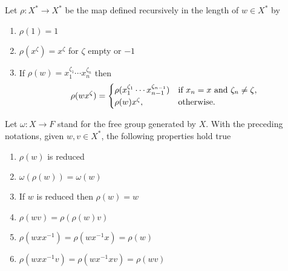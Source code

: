 \begin{ntn}
    Let\/ $\rho\colon X^*\to X^*$ be the map defined recursively in the length of\/ $w\in X^*$ by
    \begin{enumerate}[-]
        \item $\rho(1)=1$
        \item $\rho(x^\zeta)=x^\zeta$ for\/ $\zeta$ empty or\/ $-1$
        \item If\/ $\rho(w)=x_1^{\zeta_1}\cdots x_n^{\zeta_n}$ then
        $$
            \rho(wx^\zeta) = \begin{cases}
                 \rho(x_1^{\zeta_1}\cdots x_{n-1}^{\zeta_{n-1}})
                    &\text{\rm if $x_n=x$ and $\zeta_n\ne\zeta$},\\
                 \rho(w)x^\zeta,
                    &\text{\rm otherwise}.
            \end{cases}
        $$
    \end{enumerate}
\end{ntn}

\begin{lem}\label{lem:rho-properties}
    Let $\omega\colon X\to F$ stand for the free group generated by $X$. With the preceding notations, given $w,v\in X^*$, the following properties hold true
    \begin{enumerate}[\rm a)]
        \item $\rho(w)$ is reduced
        \item $\omega(\rho(w))=\omega(w)$
        \item If $w$ is reduced then $\rho(w)=w$
        \item $\rho(wv)=\rho(\rho(w)v)$
        \item $\rho(wxx^{-1})=\rho(wx^{-1}x)=\rho(w)$
        \item $\rho(wxx^{-1}v)=\rho(wx^{-1}xv)=\rho(wv)$
    \end{enumerate}
\end{lem}

